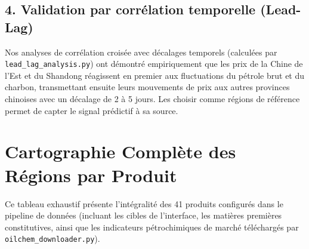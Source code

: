 \documentclass[12pt,a4paper]{article}
\begin{document}
\subsection{4. Validation par corrélation temporelle (Lead-Lag)}
Nos analyses de corrélation croisée avec décalages temporels (calculées par \texttt{lead\_lag\_analysis.py}) ont démontré empiriquement que les prix de la Chine de l'Est et du Shandong réagissent en premier aux fluctuations du pétrole brut et du charbon, transmettant ensuite leurs mouvements de prix aux autres provinces chinoises avec un décalage de 2 à 5 jours. Les choisir comme régions de référence permet de capter le signal prédictif à sa source.

\newpage
\section{Cartographie Complète des Régions par Produit}

Ce tableau exhaustif présente l'intégralité des 41 produits configurés dans le pipeline de données (incluant les cibles de l'interface, les matières premières constitutives, ainsi que les indicateurs pétrochimiques de marché téléchargés par \texttt{oilchem\_downloader.py}).
\end{document}
